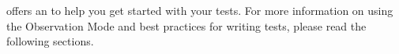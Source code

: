 \app{} offers an  to help you get started with your tests. For more information on using the Observation Mode and best practices for writing tests, please read the following sections. 

